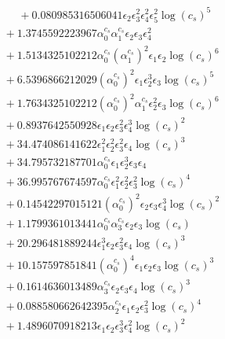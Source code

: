 \documentclass[10pt]{article}
\begin{document}
\begin{align*}
\phantom{F_{s,7}} &\phantom{={}}{}  + 0.080985316506041 \epsilon_{2} \epsilon_{3}^{2} \epsilon_{4}^{2} \epsilon_{5}^{2} \log{\left(c_{s} \right)}^{5} \\
&{}  + 1.3745592223967 \alpha_{0}^{c_s} \alpha_{1}^{c_s} \epsilon_{2} \epsilon_{3} \epsilon_{4}^{2} \\
&{}  + 1.5134325102212 \alpha_{0}^{c_s} \left(\alpha_{1}^{c_s}\right)^{2} \epsilon_{1} \epsilon_{2} \log{\left(c_{s} \right)}^{6} \\
&{}  + 6.5396866212029 \left(\alpha_{0}^{c_s}\right)^{2} \epsilon_{1} \epsilon_{2}^{3} \epsilon_{3} \log{\left(c_{s} \right)}^{5} \\
&{}  + 1.7634325102212 \left(\alpha_{0}^{c_s}\right)^{2} \alpha_{1}^{c_s} \epsilon_{2}^{2} \epsilon_{3} \log{\left(c_{s} \right)}^{6} \\
&{}  + 0.8937642550928 \epsilon_{1} \epsilon_{2} \epsilon_{3}^{2} \epsilon_{4}^{3} \log{\left(c_{s} \right)}^{2} \\
&{}  + 34.474086141622 \epsilon_{1}^{2} \epsilon_{2}^{2} \epsilon_{3}^{2} \epsilon_{4} \log{\left(c_{s} \right)}^{3} \\
&{}  + 34.795732187701 \alpha_{0}^{c_s} \epsilon_{1} \epsilon_{2}^{3} \epsilon_{3} \epsilon_{4} \\
&{}  + 36.995767674597 \alpha_{0}^{c_s} \epsilon_{1}^{2} \epsilon_{2}^{2} \epsilon_{3}^{2} \log{\left(c_{s} \right)}^{4} \\
&{}  + 0.14542297015121 \left(\alpha_{0}^{c_s}\right)^{2} \epsilon_{2} \epsilon_{3} \epsilon_{4}^{3} \log{\left(c_{s} \right)}^{2} \\
&{}  + 1.1799361013441 \alpha_{0}^{c_s} \alpha_{3}^{c_s} \epsilon_{2} \epsilon_{3} \log{\left(c_{s} \right)} \\
&{}  + 20.296481889244 \epsilon_{1}^{3} \epsilon_{2} \epsilon_{3}^{2} \epsilon_{4} \log{\left(c_{s} \right)}^{3} \\
&{}  + 10.157597851841 \left(\alpha_{0}^{c_s}\right)^{4} \epsilon_{1} \epsilon_{2} \epsilon_{3} \log{\left(c_{s} \right)}^{3} \\
&{}  + 0.1614636013489 \alpha_{3}^{c_s} \epsilon_{2} \epsilon_{3} \epsilon_{4} \log{\left(c_{s} \right)}^{3} \\
&{}  + 0.088580662642395 \alpha_{2}^{c_s} \epsilon_{1} \epsilon_{2} \epsilon_{3}^{2} \log{\left(c_{s} \right)}^{4} \\
&{}  + 1.4896070918213 \epsilon_{1} \epsilon_{2} \epsilon_{3}^{3} \epsilon_{4}^{2} \log{\left(c_{s} \right)}^{2} \\

\end{align*}
\end{document}
